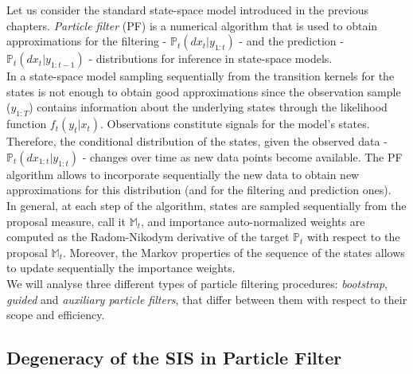 \documentclass[
]{book}
\theoremstyle{break}
\theoremstyle{nonumberplain}
\begin{document}
Let us consider the standard state-space model introduced in the
previous chapters. \color{black} \textit{Particle filter} (PF) is a
numerical algorithm that is used to obtain approximations for the
filtering - \(\mathbb P_t (dx_t|y_{1:t})\) - and the prediction -
\(\mathbb P_t (dx_t|y_{1:t-1})\) - distributions for inference in
state-space models.~\\
In a state-space model sampling sequentially from the transition kernels
for the states is not enough to obtain good approximations since the
observation sample (\(y_{1:T}\)) contains information about the
underlying states through the likelihood function \(f_t(y_t|x_t)\).
Observations constitute signals for the model's states.\\
Therefore, the conditional distribution of the states, given the
observed data - \(\mathbb P_t(dx_{1:t}|y_{1:t})\) - changes over time as
new data points become available. The PF algorithm allows to incorporate
sequentially the new data to obtain new approximations for this
distribution (and for the filtering and prediction ones).\\
In general, at each step of the algorithm, states are sampled
sequentially from the proposal measure, call it \(\mathbb M_t\), and
importance auto-normalized weights are computed as the Radom-Nikodym
derivative of the target \(\mathbb P_t\) with respect to the proposal
\(\mathbb M_t\). Moreover, the Markov properties of the sequence of the
states allows to update sequentially the importance weights.~\\
We will analyse three different types of particle filtering procedures:
\textit{bootstrap}, \textit{guided} and
\textit{auxiliary particle filters}, that differ between them with
respect to their scope and efficiency.

\subsection{Degeneracy of the SIS in Particle Filter}
\end{document}
